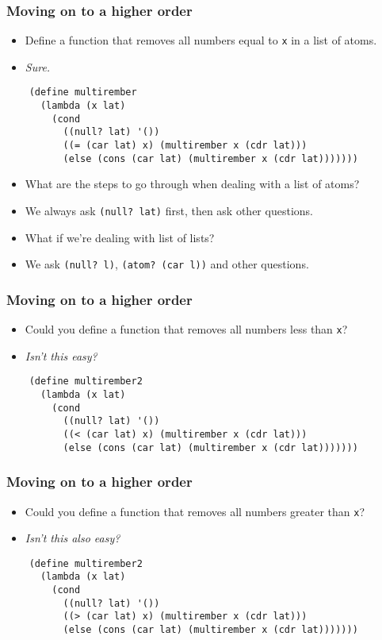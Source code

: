 \begin{frame}[fragile]
  \frametitle{Moving on to a higher order}
  \begin{itemize}
    \item Define a function that removes all numbers equal to \texttt{x} in a list of atoms.
    \item \emph{Sure.}
  \end{itemize}
  \begin{verbatim}
    (define multirember
      (lambda (x lat)
        (cond
          ((null? lat) '())
          ((= (car lat) x) (multirember x (cdr lat)))
          (else (cons (car lat) (multirember x (cdr lat)))))))
  \end{verbatim}
  \pause
  \begin{itemize}
    \item What are the steps to go through when dealing with a list of atoms?
    \item We always ask \texttt{(null? lat)} first, then ask other questions.
    \item What if we're dealing with list of lists?
    \pause
    \item We ask \texttt{(null? l)}, \texttt{(atom? (car l))} and other questions.
  \end{itemize}
\end{frame}

\begin{frame}[fragile]
  \frametitle{Moving on to a higher order}
  \begin{itemize}
    \item Could you define a function that removes all numbers less than \texttt{x}?
    \item \emph{Isn't this easy?}
  \end{itemize}
  \begin{verbatim}
    (define multirember2
      (lambda (x lat)
        (cond
          ((null? lat) '())
          ((< (car lat) x) (multirember x (cdr lat)))
          (else (cons (car lat) (multirember x (cdr lat)))))))
  \end{verbatim}
\end{frame}

\begin{frame}[fragile]
  \frametitle{Moving on to a higher order}
  \begin{itemize}
    \item Could you define a function that removes all numbers greater than \texttt{x}?
    \item \emph{Isn't this also easy?}
  \end{itemize}
  \begin{verbatim}
    (define multirember2
      (lambda (x lat)
        (cond
          ((null? lat) '())
          ((> (car lat) x) (multirember x (cdr lat)))
          (else (cons (car lat) (multirember x (cdr lat)))))))
  \end{verbatim}
\end{frame}


